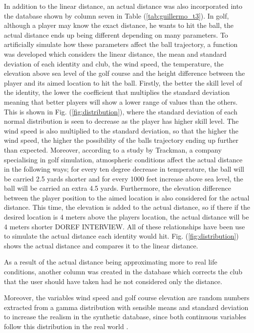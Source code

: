 \documentclass[11pt,landscape]{article}
\begin{document}
\begin{multicols}{3}
In addition to the linear distance, an actual distance was also incorporated
into the database shown by column seven in Table (\ref{tab:guillermo_t3}). In
golf, although a player may know the exact distance, he wants to hit the ball,
the actual distance ends up being different depending on many parameters. To
artificially simulate how these parameters affect the ball trajectory, a
function was developed which considers the linear distance, the mean and
standard deviation of each identity and club, the wind speed, the temperature,
the elevation above sea level of the golf course and the height difference
between the player and its aimed location to hit the ball. Firstly, the better
the skill level of the identity, the lower the coefficient that multiplies the
standard deviation meaning that better players will show a lower range of values
than the others. This is shown in Fig. (\ref{fig:distribution}), where the
standard deviation of each normal distribution is seen to decrease as the player
has higher skill level. The wind speed is also multiplied to the standard
deviation, so that the higher the wind speed, the higher the possibility of the
balls trajectory ending up further than expected. Moreover, according to a study
by Trackman, a company specialising in golf simulation, atmospheric conditions
affect the actual distance in the following ways; for every ten degree decrease
in temperature, the ball will be carried 2.5 yards shorter and for every 1000
feet increase above sea level, the ball will be carried an extra 4.5 yards.
Furthermore, the elevation difference between the player position to the aimed
location is also considered for the actual distance. This time, the elevation is
added to the actual distance, so if there if the desired location is 4 meters
above the players location, the actual distance will be 4 meters shorter DOREF
INTERVIEW. All of these relationships have been use to simulate the actual
distance each identity would hit. Fig. (\ref{fig:distribution}) shows the actual
distance and compares it to the linear distance. 

As a result of the actual distance being approximating more to real life
conditions, another column was created in the database which corrects the club
that the user should have taken had he not considered only the distance. 

Moreover, the variables wind speed and golf course elevation are random numbers
extracted from a gamma distribution with sensible means and standard deviation
to increase the realism in the synthetic database, since both continuous
variables follow this distribution in the real world \cite{wind_dist}. 


\end{multicols}
\end{document}
